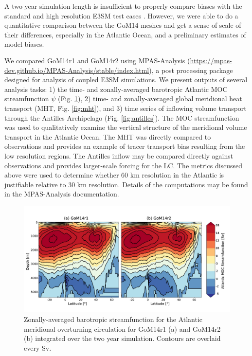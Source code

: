 A two year simulation length is insufficient to properly compare biases with the standard and high resolution E3SM test cases \citep{golaz2022doe, caldwell2019doe}. However, we were able to do a quantitative comparison between the GoM14 meshes and get a sense of scale of their differences, especially in the Atlantic Ocean, and a preliminary estimates of model biases. 

We compared GoM14r1 and GoM14r2 using MPAS-Analysis (\url{https://mpas-dev.github.io/MPAS-Analysis/stable/index.html}), a post processing package designed for analysis of coupled E3SM simulations. We present outputs of several analysis tasks: 1) the time- and zonally-averaged barotropic Atlantic MOC streamfunction $\psi$ (Fig. \ref{fig:moc}), 2) time- and zonally-averaged global meridional heat transport (MHT, Fig. \ref{fig:mht}), and 3) time series of inflowing volume transport through the Antilles Archipelago (Fig. \ref{fig:antilles}). The MOC streamfunction was used to qualitatively examine the vertical structure of the meridional volume transport in the Atlantic Ocean. The MHT was directly compared to observations \citep{trenberth2001estimates} and provides an example of tracer transport bias resulting from the low resolution regions. The Antilles inflow may be compared directly against observations and provides larger-scale forcing for the LC. The metrics discussed above were used to determine whether 60 km resolution in the Atlantic is justifiable relative to 30 km resolution. Details of the computations may be found in the MPAS-Analysis documentation. 

\begin{figure}[h]
\centerline{\includegraphics[width=\textwidth]{figures/scgsr/atlantic_moc.jpg}}
    \caption{Zonally-averaged barotropic streamfunction for the Atlantic meridional overturning circulation for GoM14r1 (a) and GoM14r2 (b) integrated over the two year simulation. Contours are overlaid every Sv.}
    \label{fig:moc}
\end{figure}

